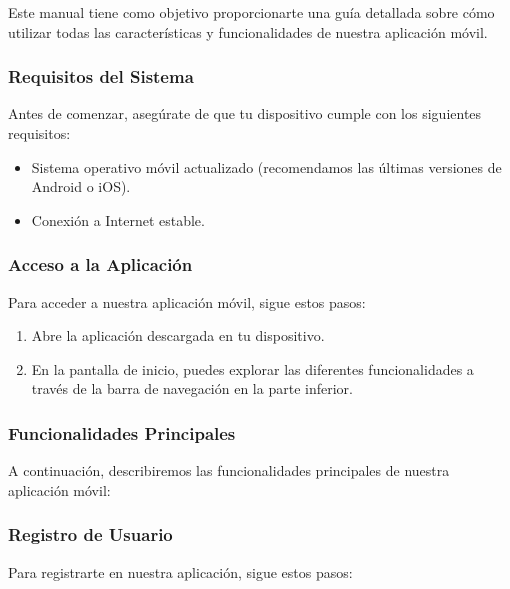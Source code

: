 Este manual tiene como objetivo proporcionarte una guía detallada sobre cómo utilizar todas las características y funcionalidades de nuestra aplicación móvil.

\subsubsection{Requisitos del Sistema}
Antes de comenzar, asegúrate de que tu dispositivo cumple con los siguientes requisitos:

\begin{itemize}
	\item Sistema operativo móvil actualizado (recomendamos las últimas versiones de Android o iOS).
	\item Conexión a Internet estable.
\end{itemize}

\subsubsection{Acceso a la Aplicación}
Para acceder a nuestra aplicación móvil, sigue estos pasos:

\begin{enumerate}
	\item Abre la aplicación descargada en tu dispositivo.
	\item En la pantalla de inicio, puedes explorar las diferentes funcionalidades a través de la barra de navegación en la parte inferior.
\end{enumerate}

\subsubsection{Funcionalidades Principales}
A continuación, describiremos las funcionalidades principales de nuestra aplicación móvil:

\subsubsection{Registro de Usuario}
Para registrarte en nuestra aplicación, sigue estos pasos:

